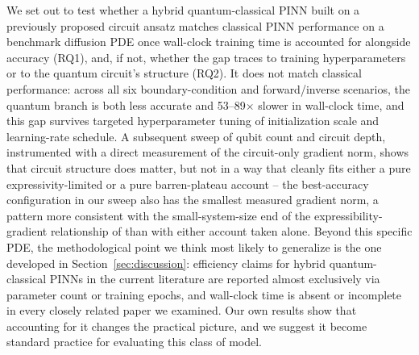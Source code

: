 We set out to test whether a hybrid quantum-classical PINN built on a
previously proposed circuit ansatz matches classical PINN performance on a
benchmark diffusion PDE once wall-clock training time is accounted for
alongside accuracy (RQ1), and, if not, whether the gap traces to training
hyperparameters or to the quantum circuit's structure (RQ2). It does not
match classical performance: across all six boundary-condition and
forward/inverse scenarios, the quantum branch is both less accurate and
53--89$\times$ slower in wall-clock time, and this gap survives targeted
hyperparameter tuning of initialization scale and learning-rate schedule.
A subsequent sweep of qubit count and circuit depth, instrumented with a
direct measurement of the circuit-only gradient norm, shows that circuit
structure does matter, but not in a way that cleanly fits either a pure
expressivity-limited or a pure barren-plateau account -- the best-accuracy
configuration in our sweep also has the smallest measured gradient norm,
a pattern more consistent with the small-system-size end of the
expressibility-gradient relationship of \citet{holmes2022expressibility}
than with either account taken alone. Beyond this specific PDE, the
methodological point we think most likely to generalize is the one
developed in Section~\ref{sec:discussion}: efficiency claims for hybrid
quantum-classical PINNs in the current literature are reported almost
exclusively via parameter count or training epochs, and wall-clock time is
absent or incomplete in every closely related paper we examined. Our own
results show that accounting for it changes the practical picture, and we
suggest it become standard practice for evaluating this class of model.
